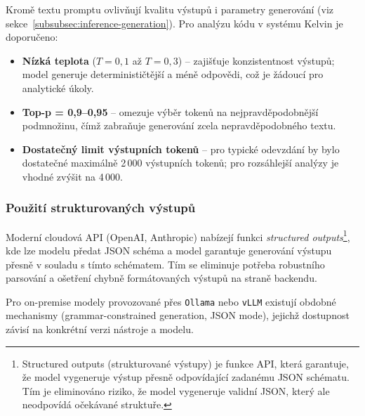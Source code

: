 Kromě textu promptu ovlivňují kvalitu výstupů i parametry generování (viz sekce~\ref{subsubsec:inference-generation}).
Pro analýzu kódu v systému Kelvin je doporučeno:

\begin{itemize}
    \item \textbf{Nízká teplota} ($T = 0,1$ až $T = 0,3$) -- zajišťuje konzistentnost výstupů; model generuje determinističtější a méně  odpovědi, což je žádoucí pro analytické úkoly.

    \item \textbf{Top-p = 0,9--0,95} -- omezuje výběr tokenů na nejpravděpodobnější podmnožinu, čímž zabraňuje generování zcela nepravděpodobného textu.

    \item \textbf{Dostatečný limit výstupních tokenů} -- pro typické odevzdání by bylo dostatečné maximálně 2\,000 výstupních tokenů; pro rozsáhlejší analýzy je vhodné zvýšit na 4\,000.
\end{itemize}

\subsubsection*{Použití strukturovaných výstupů}

Moderní cloudová API (OpenAI, Anthropic) nabízejí funkci \emph{structured outputs}\footnote{Structured outputs (strukturované výstupy) je funkce API, která garantuje, že model vygeneruje výstup přesně odpovídající zadanému JSON schématu. Tím je eliminováno riziko, že model vygeneruje validní JSON, který ale neodpovídá očekávané struktuře.},
kde lze modelu předat JSON schéma a model garantuje generování výstupu přesně v souladu s tímto schématem.
Tím se eliminuje potřeba robustního parsování a ošetření chybně formátovaných výstupů na straně backendu.

Pro on-premise modely provozované přes \texttt{Ollama} nebo \texttt{vLLM} existují obdobné mechanismy (grammar-constrained generation, JSON mode), jejichž dostupnost závisí na konkrétní verzi nástroje a modelu.

\endinput
